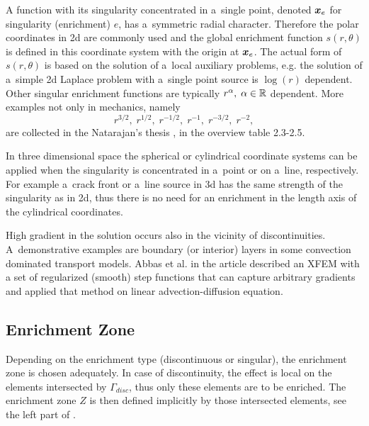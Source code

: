 A function with its singularity concentrated in a~single point, denoted $\mathbf{\boldsymbol{x}}_e$ for singularity (enrichment) $e$, has a~symmetric radial character.
Therefore the polar coordinates in 2d are commonly used and the global enrichment function $s(r,\theta)$ is defined in this coordinate system with the origin at $\mathbf{\boldsymbol{x}}_e$.
The actual form of $s(r,\theta)$ is based on the solution of a~local auxiliary problems, e.g. the solution of a~simple 2d Laplace problem with a~single point source 
is $\log(r)$ dependent. Other singular enrichment functions are typically $r^\alpha,\;\alpha\in\mathbb{R}$ dependent.
More examples not only in mechanics, namely
\[ r^{3/2},\;r^{1/2},\;r^{-1/2},\;r^{-1},\;r^{-3/2},\; r^{-2}, \]
are collected in the Natarajan's thesis \cite{natarajan_enriched_2011}, in the overview table 2.3-2.5.

In three dimensional space the spherical or cylindrical coordinate systems can be applied when the singularity is concentrated in a~point or on a~line, respectively.
For example a~crack front or a~line source in 3d has the same strength of the singularity as in 2d, thus there is no need for an enrichment in the length axis
of the cylindrical coordinates.

High gradient in the solution occurs also in the vicinity of discontinuities. A~demonstrative examples are boundary (or interior) layers
in some convection dominated transport models. Abbas et al. in the article \cite{abbas_alizada_fries_highgradient_2010} described an XFEM with
a set of regularized (smooth) step functions that can capture arbitrary gradients and applied that method on linear advection-diffusion equation.

\subsection{Enrichment Zone} \label{sec:glob_enr_zone}
Depending on the enrichment type (discontinuous or singular), the enrichment zone is chosen adequately.
In case of discontinuity, the effect is local on the elements intersected by $\Gamma_{disc}$, thus only
these elements are to be enriched. The enrichment zone $Z$ is then defined implicitly by those intersected elements,
see the left part of .

